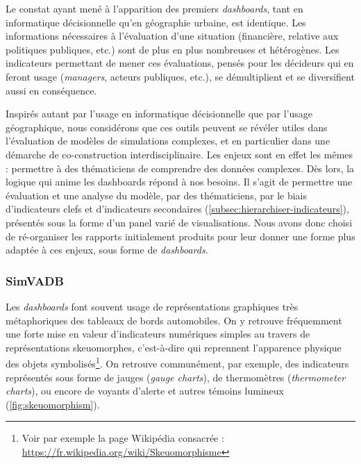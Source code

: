 Le constat ayant mené à l'apparition des premiers \textit{dashboards}, tant en informatique décisionnelle qu'en géographie urbaine, est identique.
Les informations nécessaires à l'évaluation d'une situation (financière, relative aux politiques publiques, etc.) sont de plus en plus nombreuses et hétérogènes.
Les indicateurs permettant de mener ces évaluations, pensés pour les décideurs qui en feront usage (\textit{managers}, acteurs publiques, etc.), se démultiplient et se diversifient aussi en conséquence.

Inspirés autant par l'usage en informatique décisionnelle que par l'usage géographique, nous considérons que ces outils peuvent se révéler utiles dans l'évaluation de modèles de simulations complexes, et en particulier dans une démarche de co-construction interdisciplinaire.
Les enjeux sont en effet les mêmes : permettre à des thématiciens de comprendre des données complexes.
Dès lors, la logique qui anime les dashboards répond à nos besoins.
Il s'agit de permettre une évaluation et une analyse du modèle, par des thématiciens, par le biais d'indicateurs clefs et d'indicateurs secondaires (\cref{subsec:hierarchiser-indicateurs}), présentés sous la forme d'un panel varié de visualisations.
Nous avons donc choisi de ré-organiser les rapports initialement produits pour leur donner une forme plus adaptée à ces enjeux, sous forme de \textit{dashboards}.

\subsubsection{SimVADB}\label{subsubsec:simvadb}

Les \textit{dashboards} font souvent usage de représentations graphiques très métaphoriques des tableaux de bords automobiles.
On y retrouve fréquemment une forte mise en valeur d'indicateurs numériques simples au travers de représentations skeuomorphes, c'est-à-dire qui reprennent l'apparence physique des objets symbolisés\footnote{
	Voir par exemple la page Wikipédia consacrée : \href{https://fr.wikipedia.org/wiki/Skeuomorphisme}{https://fr.wikipedia.org/wiki/Skeuomorphisme}
}.
On retrouve communément, par exemple, des indicateurs représentés sous forme de jauges (\textit{gauge charts}), de thermomètres (\textit{thermometer charts}), ou encore de voyants d'alerte et autres témoins lumineux (\cref{fig:skeuomorphism}).

